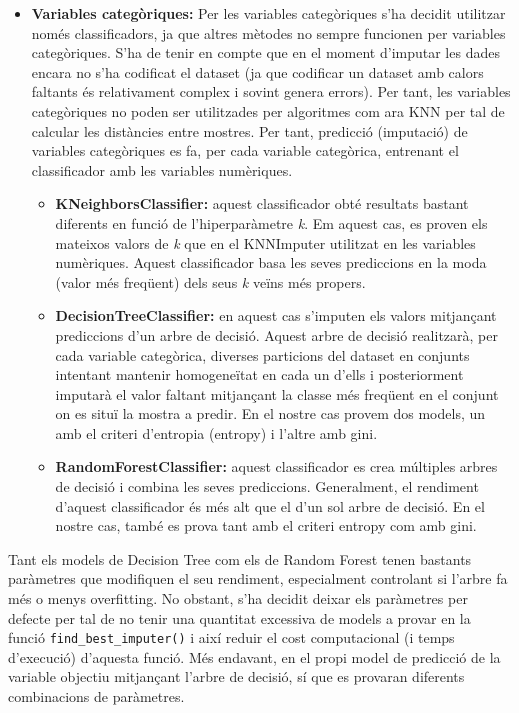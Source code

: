 \begin{itemize}
	\item \textbf{Variables categòriques:}
	Per les variables categòriques s'ha decidit utilitzar només classificadors, ja que altres mètodes no sempre funcionen per variables categòriques. S'ha de tenir en compte que en el moment d'imputar les dades encara no s'ha codificat el dataset (ja que codificar un dataset amb calors faltants és relativament complex i sovint genera errors). Per tant, les variables categòriques no poden ser utilitzades per algoritmes com ara KNN per tal de calcular les distàncies entre mostres. Per tant, predicció (imputació) de variables categòriques es fa, per cada variable categòrica, entrenant el classificador amb les variables numèriques.
	\begin{itemize}
		\item \textbf{KNeighborsClassifier:} aquest classificador obté resultats bastant diferents en funció de l'hiperparàmetre \textit{k}. Em aquest cas, es proven els mateixos valors de \textit{k} que en el KNNImputer utilitzat en les variables numèriques. Aquest classificador basa les seves prediccions en la moda (valor més freqüent) dels seus \textit{k} veïns més propers.
		\item \textbf{DecisionTreeClassifier:} en aquest cas s'imputen els valors mitjançant prediccions d'un arbre de decisió. Aquest arbre de decisió realitzarà, per cada variable categòrica, diverses particions del dataset en conjunts intentant mantenir homogeneïtat en cada un d'ells i posteriorment imputarà el valor faltant mitjançant la classe més freqüent en el conjunt on es situï la mostra a predir. En el nostre cas provem dos models, un amb el criteri d'entropia (entropy) i l'altre amb gini.
		
		\item \textbf{RandomForestClassifier:} aquest classificador es crea múltiples arbres de decisió i combina les seves prediccions. Generalment, el rendiment d'aquest classificador és més alt que el d'un sol arbre de decisió. En el nostre cas, també es prova tant amb el criteri entropy com amb gini.
	\end{itemize}
\end{itemize}

Tant els models de Decision Tree com els de Random Forest tenen bastants paràmetres que modifiquen el seu rendiment, especialment controlant si l'arbre fa més o menys overfitting. No obstant, s'ha decidit deixar els paràmetres per defecte per tal de no tenir una quantitat excessiva de models a provar en la funció \texttt{find\_best\_imputer()} i així reduir el cost computacional (i temps d'execució) d'aquesta funció. Més endavant, en el propi model de predicció de la variable objectiu mitjançant l'arbre de decisió, sí que es provaran diferents combinacions de paràmetres.

